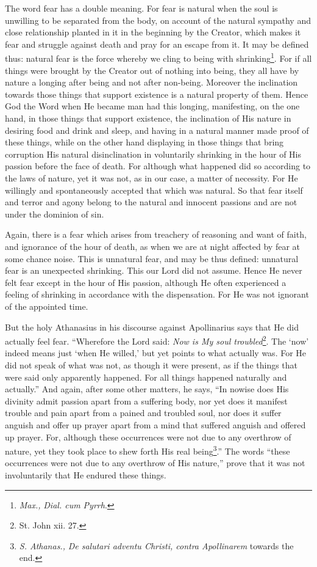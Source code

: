 The word fear has a double meaning. For fear is natural when the soul is unwilling to be separated from the body, on account of the natural sympathy and close relationship planted in it in the beginning by the Creator, which makes it fear and struggle against death and pray for an escape from it. It may be defined thus: natural fear is the force whereby we cling to being with shrinking\footnote{\emph{Max.,} \emph{Dial. cum Pyrrh}.}. For if all things were brought by the Creator out of nothing into being, they all have by nature a longing after being and not after non-being. Moreover the inclination towards those things that support existence is a natural property of them. Hence God the Word when He became man had this longing, manifesting, on the one hand, in those things that support existence, the inclination of His nature in desiring food and drink and sleep, and having in a natural manner made proof of these things, while on the other hand displaying in those things that bring corruption His natural disinclination in voluntarily shrinking in the hour of His passion before the face of death. For although what happened did so according to the laws of nature, yet it was not, as in our case, a matter of necessity. For He willingly and spontaneously accepted that which was natural. So that fear itself and terror and agony belong to the natural and innocent passions and are not under the dominion of sin.

Again, there is a fear which arises from treachery of reasoning and want of faith, and ignorance of the hour of death, as when we are at night affected by fear at some chance noise. This is unnatural fear, and may be thus defined: unnatural fear is an unexpected shrinking. This our Lord did not assume. Hence He never felt fear except in the hour of His passion, although He often experienced a feeling of shrinking in accordance with the dispensation. For He was not ignorant of the appointed time.

But the holy Athanasius in his discourse against Apollinarius says that He did actually feel fear. “Wherefore the Lord said: \emph{Now is My soul troubled}\footnote{St. John xii. 27.}. The ‘now’ indeed means just ‘when He willed,’ but yet points to what actually was. For He did not speak of what was not, as though it were present, as if the things that were said only apparently happened. For all things happened naturally and actually.” And again, after some other matters, he says, “In nowise does His divinity admit passion apart from a suffering body, nor yet does it manifest trouble and pain apart from a pained and troubled soul, nor does it suffer anguish and offer up prayer apart from a mind that suffered anguish and offered up prayer. For, although these occurrences were not due to any overthrow of nature, yet they took place to shew forth His real being\footnote{\emph{S. Athanas.,} \emph{De salutari adventu Christi, contra Apollinarem }towards the end.}.” The words “these occurrences were not due to any overthrow of His nature,” prove that it was not involuntarily that He endured these things.

